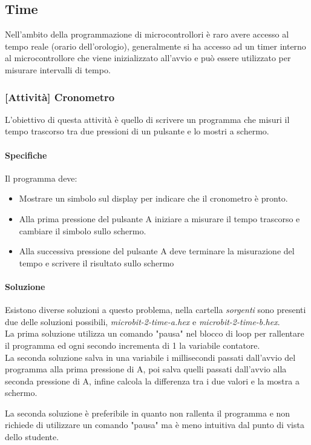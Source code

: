 \documentclass[../../docenti.tex]{subfiles}
\begin{document}
\newpage
\subsection{Time}
Nell'ambito della programmazione di microcontrollori è raro avere accesso al tempo reale (orario dell'orologio), generalmente si ha accesso ad un timer interno al microcontrollore che viene inizializzato all'avvio e può essere utilizzato per misurare intervalli di tempo.

\subsubsection{[Attività] Cronometro}
L'obiettivo di questa attività è quello di scrivere un programma che misuri il tempo trascorso tra due pressioni di un pulsante e lo mostri a schermo.

\paragraph{Specifiche} Il programma deve:
\begin{itemize}
	\item Mostrare un simbolo sul display per indicare che il cronometro è pronto.
	\item Alla prima pressione del pulsante A iniziare a misurare il tempo trascorso e cambiare il simbolo sullo schermo.
	\item Alla successiva pressione del pulsante A deve terminare la misurazione del tempo e scrivere il risultato sullo schermo
\end{itemize}

\paragraph{Soluzione}
Esistono diverse soluzioni a questo problema, nella cartella \textit{sorgenti} sono presenti due delle soluzioni possibili,  \textit{microbit-2-time-a.hex} e \textit{microbit-2-time-b.hex}.\\
La prima soluzione utilizza un comando "pausa" nel blocco di loop per rallentare il programma ed ogni secondo incrementa di 1 la variabile contatore.\\
La seconda soluzione salva in una variabile i millisecondi passati dall'avvio del programma alla prima pressione di A, poi salva quelli passati dall'avvio alla seconda pressione di A, infine calcola la differenza tra i due valori e la mostra a schermo.

La seconda soluzione è preferibile in quanto non rallenta il programma e non richiede di utilizzare un comando "pausa" ma è meno intuitiva dal punto di vista dello studente.
\end{document}
